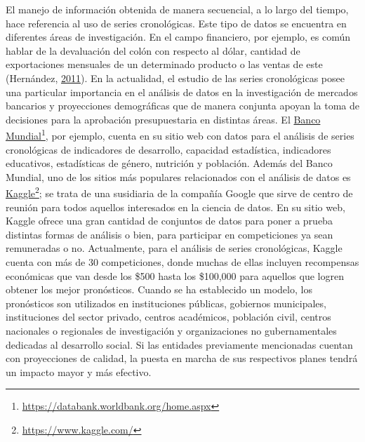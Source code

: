 \documentclass[
]{article}
\begin{document}
El manejo de información obtenida de manera secuencial, a lo largo del
tiempo, hace referencia al uso de series cronológicas. Este tipo de
datos se encuentra en diferentes áreas de investigación. En el campo
financiero, por ejemplo, es común hablar de la devaluación del colón con
respecto al dólar, cantidad de exportaciones mensuales de un determinado
producto o las ventas de este (Hernández,
\protect\hyperlink{ref-oscarh-1}{2011}). En la actualidad, el estudio de
las series cronológicas posee una particular importancia en el análisis
de datos en la investigación de mercados bancarios y proyecciones
demográficas que de manera conjunta apoyan la toma de decisiones para la
aprobación presupuestaria en distintas áreas. El
\href{https://databank.worldbank.org/home.aspx}{Banco Mundial}\footnote{\url{https://databank.worldbank.org/home.aspx}},
por ejemplo, cuenta en su sitio web con datos para el análisis de series
cronológicas de indicadores de desarrollo, capacidad estadística,
indicadores educativos, estadísticas de género, nutrición y población.
Además del Banco Mundial, uno de los sitios más populares relacionados
con el análisis de datos es
\href{https://www.kaggle.com/}{Kaggle}\footnote{\url{https://www.kaggle.com/}};
se trata de una susidiaria de la compañía Google que sirve de centro de
reunión para todos aquellos interesados en la ciencia de datos. En su
sitio web, Kaggle ofrece una gran cantidad de conjuntos de datos para
poner a prueba distintas formas de análisis o bien, para participar en
competiciones ya sean remuneradas o no. Actualmente, para el análisis de
series cronológicas, Kaggle cuenta con más de 30 competiciones, donde
muchas de ellas incluyen recompensas económicas que van desde los \$500
hasta los \$100,000 para aquellos que logren obtener los mejor
pronósticos. Cuando se ha establecido un modelo, los pronósticos son
utilizados en instituciones públicas, gobiernos municipales,
instituciones del sector privado, centros académicos, población civil,
centros nacionales o regionales de investigación y organizaciones no
gubernamentales dedicadas al desarrollo social. Si las entidades
previamente mencionadas cuentan con proyecciones de calidad, la puesta
en marcha de sus respectivos planes tendrá un impacto mayor y más
efectivo.
\end{document}
